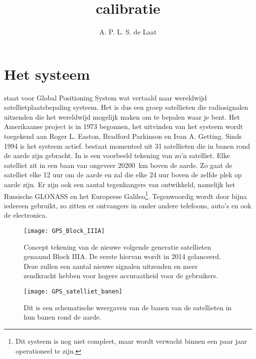 



\title{\gps calibratie}
\author{A. P. L. S. de Laat}
\date{}

\maketitle

\section{Het \gps systeem}

\gps staat voor Global Positioning System wat vertaald naar wereldwijd
satellietplaatsbepaling systeem. Het is dus een groep satellieten die
radiosignalen uitzenden die het wereldwijd mogelijk maken om te bepalen
waar je bent. Het Amerikaanse project is in 1973 begonnen, het uitvinden
van het systeem wordt toegekend aan Roger L. Easton, Bradford Parkinson
en Ivan A. Getting. Sinds 1994 is het systeem actief. \gps bestaat
momenteel uit 31 satellieten die in banen rond de aarde zijn gebracht.
In  is een voorbeeld tekening van zo'n \gps
satelliet. Elke \gps satelliet zit in een baan van ongeveer
\SI{20200}{\kilo\meter} boven de aarde. Zo gaat de satelliet elke 12 uur
om de aarde en zal die elke 24 uur boven de zelfde plek op aarde zijn.
Er zijn ook een aantal tegenhangers van \gps ontwikkeld, namelijk het
Russische GLONASS en het Europeese Galileo\footnote{Dit systeem is nog
niet compleet, maar wordt verwacht binnen een paar jaar operationeel te
zijn.}. Tegenwoordig wordt \gps door bijna iedereen gebruikt, zo zitten
er \gps ontvangers in onder andere telefoons, auto's en ook de \hisparc
electronica.

\begin{figure}
    \centering
    \texttt{[image: GPS\_Block\_IIIA]}
    \caption{Concept tekening van de nieuwe volgende generatie \gps
    satellieten genaamd \gps Block IIIA. De eerste hiervan wordt in 2014
    gelanceerd. Deze zullen een aantal nieuwe signalen uitzenden en meer
    zendkracht hebben voor hogere accuraatheid voor de gebruikers.}
    \label{fig:GPSBlockIIIA}
\end{figure}

\begin{figure}
    \centering
    \texttt{[image: GPS\_satelliet\_banen]}
    \caption{Dit is een schematische weergaven van de banen van de \gps
    satellieten in hun banen rond de aarde.}
    \label{fig:GPS_satelliet_banen}
\end{figure}


